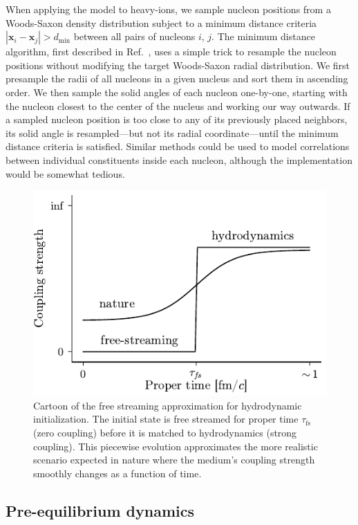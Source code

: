 \documentclass[aps,prc,reprint,amsmath,nofootinbib]{revtex4-1}
\newcommand{\taufs}{\tau_\text{fs}}
\newcommand{\xv}{\mathbf x}
\begin{document}
When applying the model to heavy-ions, we sample nucleon positions from a Woods-Saxon density distribution subject to a minimum distance criteria $|\xv_i - \xv_j| > d_\mathrm{min}$ between all pairs of nucleons $i$, $j$.
The minimum distance algorithm, first described in Ref.~\cite{Bernhard:2018hnz}, uses a simple trick to resample the nucleon positions without modifying the target Woods-Saxon radial distribution.
We first presample the radii of all nucleons in a given nucleus and sort them in ascending order.
We then sample the solid angles of each nucleon one-by-one, starting with the nucleon closest to the center of the nucleus and working our way outwards.
If a sampled nucleon position is too close to any of its previously placed neighbors, its solid angle is resampled---but not its radial coordinate---until the minimum distance criteria is satisfied.
Similar methods could be used to model correlations between individual constituents inside each nucleon, although the implementation would be somewhat tedious.

\begin{figure}
  \includegraphics{coupling}
  \caption{
    \label{fig:coupling}
    Cartoon of the free streaming approximation for hydrodynamic initialization. The initial state is free streamed for proper time $\taufs$ (zero coupling) before it is matched to hydrodynamics (strong coupling).
    This piecewise evolution approximates the more realistic scenario expected in nature where the medium's coupling strength smoothly changes as a function of time.
  }
\end{figure}

\subsection{Pre-equilibrium dynamics}
\end{document}
